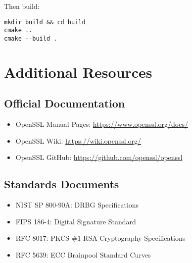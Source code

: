 Then build:
\begin{verbatim}
mkdir build && cd build
cmake ..
cmake --build .
\end{verbatim}

\section{Additional Resources}

\subsection{Official Documentation}
\begin{itemize}
    \item OpenSSL Manual Pages: \url{https://www.openssl.org/docs/}
    \item OpenSSL Wiki: \url{https://wiki.openssl.org/}
    \item OpenSSL GitHub: \url{https://github.com/openssl/openssl}
\end{itemize}

\subsection{Standards Documents}
\begin{itemize}
    \item NIST SP 800-90A: DRBG Specifications
    \item FIPS 186-4: Digital Signature Standard
    \item RFC 8017: PKCS \#1 RSA Cryptography Specifications
    \item RFC 5639: ECC Brainpool Standard Curves
\end{itemize}

